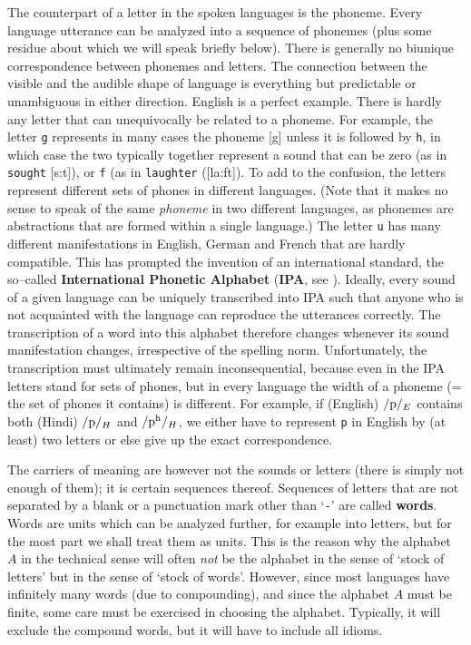 The counterpart of a letter in the spoken languages is the
phoneme.
Every language utterance can be analyzed into a sequence of
phonemes (plus some residue about which we will speak briefly
below). There is generally no biunique correspondence between
phonemes and letters. The connection between the visible and the
audible shape of language is everything but predictable or unambiguous 
in either direction. English is a perfect example. There is hardly any 
letter that can unequivocally be related to a phoneme. For example, 
the letter {\tt g} represents in many cases the phoneme [g] unless it 
is followed by {\tt h}, in which case the two typically together
represent a sound that can be zero (as in {\tt sought}
[s{\textopeno}:t]), or {\tt f} (as in {\tt laughter} ([la:ft\textschwa]).
To add to the confusion, the letters represent different sets of 
phones in different languages. (Note that it makes no sense to 
speak of the same {\it phoneme\/} in two different languages, 
as phonemes are abstractions that are formed within a single 
language.) The letter {\tt u} has many different manifestations 
in English, German and French 
that are hardly compatible. This has prompted the invention
of an international standard, the so--called \textbf{International
Phonetic Alphabet} (\textbf{IPA}, see \cite{ipahandbook}). Ideally,
every sound of a given language can be uniquely transcribed into
IPA such that anyone who is not acquainted with the language can
reproduce the utterances correctly. The transcription of a word
into this alphabet therefore changes whenever its sound
manifestation changes, irrespective of the spelling norm.
Unfortunately, the transcription must ultimately remain 
inconsequential, because even in the IPA letters stand for 
sets of phones, but in every language the width of a phoneme 
(= the set of phones it contains) is different. For example, 
if (English) $/\mbox{\rm p}/_E$ contains both (Hindi) 
$/\mbox{\rm p}/_H$ and  $/\mbox{\rm p\textsuperscript{h}}/_H$, 
we either have to represent {\tt p} in English by (at least) two 
letters or else give up the exact correspondence. 

The carriers of meaning are however not the sounds or letters
(there is simply not enough of them); it is certain sequences
thereof. Sequences of letters that are not separated by a
blank or a punctuation mark other than `{\tt -}' are called
\textbf{words}. Words are units which can be analyzed further, for
example into letters, but for the most part we shall treat them
as units. This is the reason why the alphabet $A$ in the technical
sense will often {\it not\/} be the alphabet in the sense of
`stock of letters' but in the sense of `stock of words'. However,
since most languages have infinitely many words (due to
compounding), and since the alphabet $A$ must be finite, some care
must be exercised in choosing the alphabet. Typically, it will 
exclude the compound words, but it will have to include all idioms. 

